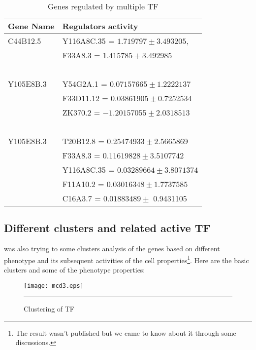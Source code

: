 \begin{table}
	\centering
\begin{tabular}{l l }
      \toprule
      \textbf{Gene Name} & \textbf{Regulators activity} \\
      \midrule
	      {\color{green}C44B12.5} & {\color{blue} Y116A8C.35 }= $ 1.719797 \pm 3.493205 $, \\ 
				    & {\color{blue}F33A8.3} = $ 1.415785 \pm 3.492985$ \\~\\

		{\color{green}Y105E8B.3} & {\color{blue} Y54G2A.1} = $ 0.07157665 \pm 1.2222137 $ \\
		  & {\color{blue} F33D11.12} = $ 0.03861905 \pm 0.7252534 $ \\
 		  & {\color{blue} ZK370.2} = $ -1.20157055 \pm  2.0318513 $\\~\\
		    
	      {\color{green} Y105E8B.3} & {\color{blue} T20B12.8 } = $ 0.25474933 \pm  2.5665869 $ \\
		  			& {\color{blue} F33A8.3 } = $ 0.11619828  \pm  3.5107742 $ \\
 		  			& {\color{blue} Y116A8C.35 } = $ 0.03289664 \pm  3.8071374 $ \\
					& {\color{blue} F11A10.2 } = $ 0.03016348 \pm 1.7737585 $ \\
 		  			& {\color{blue} C16A3.7  } = $ 0.01883489 \pm  $ 0.9431105\\

  \bottomrule
  \end{tabular}
	  \caption[Genes regulated by multiple TF]
		  {Genes regulated by multiple TF}
	  \label{table:Genes_regulated_by_multiple_TF}
\end{table}

\subsection{Different clusters and related active TF}
\cite{Cossins:2007} was also trying to some clusters analysis of the genes based on different
phenotype and its subsequent activities of the cell properties\footnote{The result wasn't published but we came to know 
about it through some discussions.}.
Here are the basic clusters and some of the phenotype properties:

\begin{figure}
	\centering
		\texttt{[image: mcd3.eps]}
		\rule{35em}{0.5pt}
	\caption[Clustering of TF]
		{Clustering of TF}
	\label{fig:Clustering_TF}
\end{figure}


